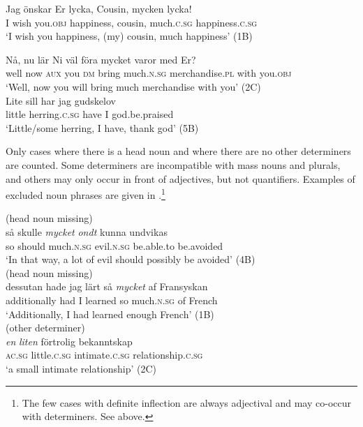\documentclass[output=paper]{langscibook}
\begin{document}
\ea\label{ex:delsing:6}
\ea
\gll Jag  önskar    Er        lycka,      Cousin,  mycken      lycka! \\
I          wish     you.\textsc{obj}   happiness,  cousin,    much.\textsc{c}.\textsc{sg}  happiness.\textsc{c}.\textsc{sg}\\
\glt ‘I wish you happiness, (my) cousin, much happiness’ (1B)

\ex
\gll Nå,    nu    lär    Ni        väl    föra    mycket      varor med      Er? \\
    well    now    \textsc{aux}  you      \textsc{dm}     bring  much.\textsc{n.sg}  merchandise.\textsc{pl} with     you.\textsc{obj}\\
\glt ‘Well, now you will bring much merchandise with you’ (2C)\\

\ex
\gll Lite    sill            har    jag    gudskelov \\
    little    herring.\textsc{c}.\textsc{sg}   have   I       god.be.praised\\
    \glt ‘Little/some herring, I have, thank god’ (5B)\\
\z
\z



Only cases where there is a head noun and where there are no other determiners are counted. Some determiners are incompatible with mass nouns and plurals, and others may only occur in front of adjectives, but not quantifiers. Examples of excluded noun phrases are given in .\footnote{The few cases with definite inflection are always adjectival and may co-occur with determiners. See  above.}


\ea\label{ex:delsing:7}
\ea(head noun missing)\\
\gll så    skulle  \textit{mycket}         \textit{ondt}          kunna     undvikas     \\
so        should  much.\textsc{n.sg}   {evil.\textsc{n.sg}}  be.able.to be.avoided \\
    \glt ‘In that way, a lot of evil should possibly be avoided’ (4B)\\
\ex(head noun missing)\\
\gll dessutan    hade  jag  lärt      så    \textit{mycket} af    Fransyskan\\
     additionally  had  I      learned    so    {much.\textsc{n.sg}}   of    French\\
\glt ‘Additionally, I had learned enough French’ (1B)\\
\ex  (other determiner)\\
\gll \textit{en}         \textit{liten}          förtrolig        bekanntskap\\
    \textsc{ac.sg}    little\textsc{.c.sg}  intimate\textsc{.c.sg}     relationship.\textsc{c.sg}\\
    \glt ‘a small intimate relationship’ (2C)\\
\z
\z
\end{document}
